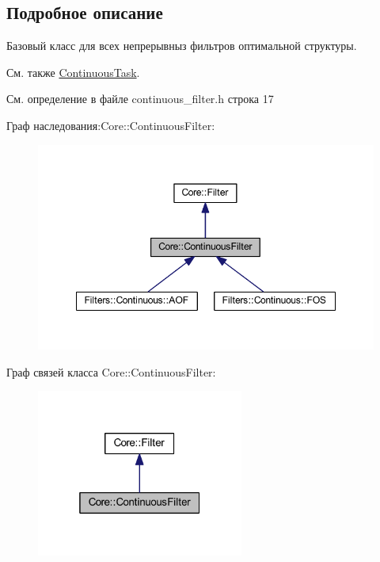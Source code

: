 \subsection{Подробное описание}
Базовый класс для всех непрерывныз фильтров оптимальной структуры. 

\begin{DoxySeeAlso}{См. также}
\hyperlink{class_core_1_1_continuous_task}{Continuous\+Task}. 
\end{DoxySeeAlso}


См. определение в файле continuous\+\_\+filter.\+h строка 17



Граф наследования\+:Core\+:\+:Continuous\+Filter\+:
\nopagebreak
\begin{figure}[H]
\begin{center}
\leavevmode
\includegraphics[width=348pt]{class_core_1_1_continuous_filter__inherit__graph}
\end{center}
\end{figure}


Граф связей класса Core\+:\+:Continuous\+Filter\+:
\nopagebreak
\begin{figure}[H]
\begin{center}
\leavevmode
\includegraphics[width=193pt]{class_core_1_1_continuous_filter__coll__graph}
\end{center}
\end{figure}


